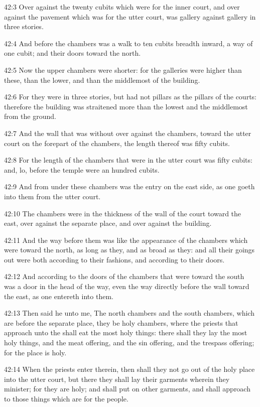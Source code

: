42:3 Over against the twenty cubits which were for the inner court,
and over against the pavement which was for the utter court, was
gallery against gallery in three stories.

42:4 And before the chambers was a walk to ten cubits breadth inward,
a way of one cubit; and their doors toward the north.

42:5 Now the upper chambers were shorter: for the galleries were
higher than these, than the lower, and than the middlemost of the
building.

42:6 For they were in three stories, but had not pillars as the
pillars of the courts: therefore the building was straitened more than
the lowest and the middlemost from the ground.

42:7 And the wall that was without over against the chambers, toward
the utter court on the forepart of the chambers, the length thereof
was fifty cubits.

42:8 For the length of the chambers that were in the utter court was
fifty cubits: and, lo, before the temple were an hundred cubits.

42:9 And from under these chambers was the entry on the east side, as
one goeth into them from the utter court.

42:10 The chambers were in the thickness of the wall of the court
toward the east, over against the separate place, and over against the
building.

42:11 And the way before them was like the appearance of the chambers
which were toward the north, as long as they, and as broad as they:
and all their goings out were both according to their fashions, and
according to their doors.

42:12 And according to the doors of the chambers that were toward the
south was a door in the head of the way, even the way directly before
the wall toward the east, as one entereth into them.

42:13 Then said he unto me, The north chambers and the south chambers,
which are before the separate place, they be holy chambers, where the
priests that approach unto the \LORD shall eat the most holy things:
there shall they lay the most holy things, and the meat offering, and
the sin offering, and the trespass offering; for the place is holy.

42:14 When the priests enter therein, then shall they not go out of
the holy place into the utter court, but there they shall lay their
garments wherein they minister; for they are holy; and shall put on
other garments, and shall approach to those things which are for the
people.


